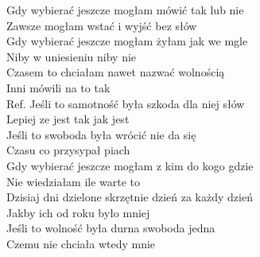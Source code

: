 
\begin{flushleft}
Gdy wybierać jeszcze mogłam mówić tak lub nie \\
Zawsze mogłam wstać i wyjść bez słów \\
Gdy wybierać jeszcze mogłam żyłam jak we mgle \\
Niby w uniesieniu niby nie \\
Czasem to chciałam nawet nazwać wolnością \\
Inni mówili na to tak \\
\vskip 3mm
Ref. Jeśli to samotność była szkoda dla niej słów \\
\hspace{0.9cm}Lepiej ze jest tak jak jest \\
\hspace{0.9cm}Jeśli to swoboda była wrócić nie da się \\
\hspace{0.9cm}Czasu co przysypał piach \\
\vskip 3mm
Gdy wybierać jeszcze mogłam z kim do kogo gdzie \\
Nie wiedziałam ile warte to \\
Dzisiaj dni dzielone skrzętnie dzień za każdy dzień \\
Jakby ich od roku było mniej \\
Jeśli to wolność była durna swoboda jedna \\
Czemu nie chciała wtedy mnie \\
\end{flushleft}
\clearpage